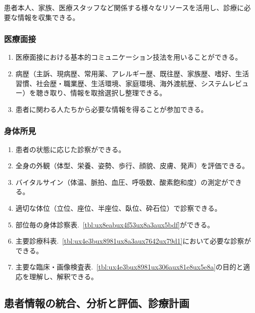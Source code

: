 \documentclass[
]{ltjsarticle}
\providecommand{\tightlist}{%
  \setlength{\itemsep}{0pt}\setlength{\parskip}{0pt}}
\begin{document}
患者本人、家族、医療スタッフなど関係する様々なリソースを活用し、診療に必要な情報を収集できる。

\hypertarget{ux533bux7642ux9762ux63a5}{%
\subsubsection{医療面接}\label{ux533bux7642ux9762ux63a5}}

\begin{enumerate}
\def\labelenumi{\arabic{enumi}.}
\tightlist
\item
  医療面接における基本的コミュニケーション技法を用いることができる。
\item
  病歴（主訴、現病歴、常用薬、アレルギー歴、既往歴、家族歴、嗜好、生活習慣、社会歴・職業歴、生活環境、家庭環境、海外渡航歴、システムレビュー）を聴き取り、情報を取捨選択し整理できる。
\item
  患者に関わる人たちから必要な情報を得ることが参加できる。
\end{enumerate}

\hypertarget{ux8eabux4f53ux6240ux898b}{%
\subsubsection{身体所見}\label{ux8eabux4f53ux6240ux898b}}

\begin{enumerate}
\def\labelenumi{\arabic{enumi}.}
\tightlist
\item
  患者の状態に応じた診察ができる。
\item
  全身の外観（体型、栄養、姿勢、歩行、顔貌、皮膚、発声）を評価できる。
\item
  バイタルサイン（体温、脈拍、血圧、呼吸数、酸素飽和度）の測定ができる。
\item
  適切な体位（立位、座位、半座位、臥位、砕石位）で診察できる。
\item
  部位毎の身体診察表.~\ref{tbl:ux8eabux4f53ux8a3aux5bdf}ができる。
\item
  主要診療科表.~\ref{tbl:ux4e3bux8981ux8a3aux7642ux79d1}において必要な診察ができる。
\item
  主要な臨床・画像検査表.~\ref{tbl:ux4e3bux8981ux306aux81e8ux5e8a}の目的と適応を理解し、解釈できる。
\end{enumerate}

\hypertarget{ux60a3ux8005ux60c5ux5831ux306eux7d71ux5408ux5206ux6790ux3068ux8a55ux4fa1ux8a3aux7642ux8a08ux753b}{%
\subsection{患者情報の統合、分析と評価、診療計画}\label{ux60a3ux8005ux60c5ux5831ux306eux7d71ux5408ux5206ux6790ux3068ux8a55ux4fa1ux8a3aux7642ux8a08ux753b}}
\end{document}
